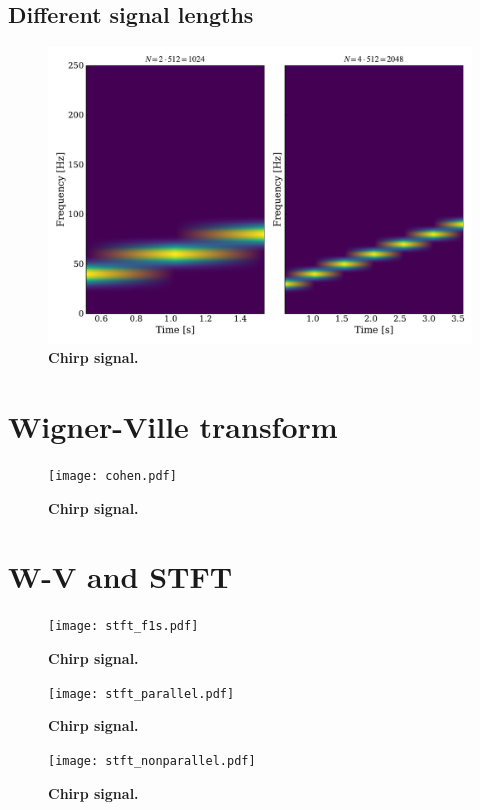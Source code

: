 \documentclass[13pt,a4paper]{article}
\begin{document}
\subsection{Different signal lengths}

\begin{figure}[ht!]
    \centering
    \caption{\textbf{Chirp signal.}}
    \includegraphics[width=\linewidth]{spectrogram_size.pdf}
\end{figure}


\section{Wigner-Ville transform}

\begin{figure}[ht!]
    \centering
    \caption{\textbf{Chirp signal.}}
    \texttt{[image: cohen.pdf]}
\end{figure}


\section{W-V and STFT}

\begin{figure}[ht!]
    \centering
    \caption{\textbf{Chirp signal.}}
    \texttt{[image: stft\_f1s.pdf]}
\end{figure}

\begin{figure}[ht!]
    \centering
    \caption{\textbf{Chirp signal.}}
    \texttt{[image: stft\_parallel.pdf]}
\end{figure}

\begin{figure}[ht!]
    \centering
    \caption{\textbf{Chirp signal.}}
    \texttt{[image: stft\_nonparallel.pdf]}
\end{figure}
\end{document}

